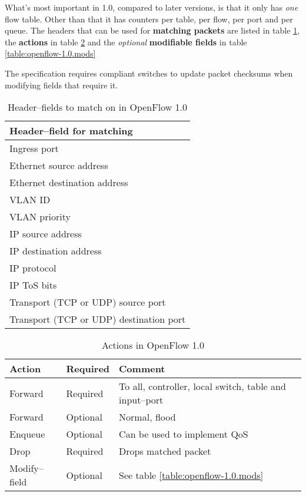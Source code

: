 What's most important in 1.0, compared to later versions, is that it only
has {\em one} flow table.  Other than that it has counters per table, per
flow, per port and per queue.  The headers that can be used for
\textbf{matching packets} are listed in table
\ref{table:openflow-1.0.headers}, the \textbf{actions} in table
\ref{table:openflow-1.0.actions} and the {\em optional} \textbf{modifiable
fields} in table \ref{table:openflow-1.0.mods}

The specification requires compliant switches to update packet checksums
when modifying fields that require it.

\begin{table}
\begin{tabular}{|l|}
\hline \textbf{Header--field for matching} \\
\hline Ingress port \\
\hline Ethernet source address \\
\hline Ethernet destination address \\
\hline VLAN ID \\
\hline VLAN priority \\
\hline IP source address \\
\hline IP destination address \\
\hline IP protocol \\
\hline IP \ac{ToS} bits \\
\hline Transport (TCP or UDP) source port \\
\hline Transport (TCP or UDP) destination port \\
\hline
\end{tabular}
\caption{Header--fields to match on in OpenFlow 1.0}
\label{table:openflow-1.0.headers}
\end{table}

\begin{table}
\begin{tabular}{|l|l|l|}
\hline \textbf{Action} &
       \textbf{Required} &
       \textbf{Comment} \\
\hline Forward & Required & To all, controller, local switch, table and input--port \\
\hline Forward & Optional & Normal, flood \\
\hline Enqueue & Optional &  Can be used to implement \ac{QoS} \\
\hline Drop    & Required &  Drops matched packet \\
\hline Modify--field & Optional &  See table \ref{table:openflow-1.0.mods} \\
\hline
\end{tabular}
\caption{Actions in OpenFlow 1.0}
\label{table:openflow-1.0.actions}
\end{table}


